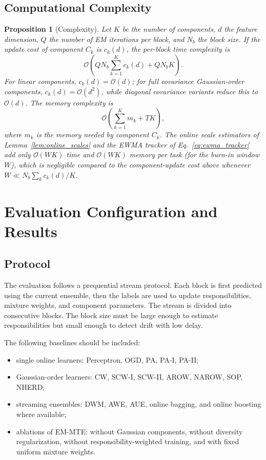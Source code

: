 ﻿\documentclass[12pt,a4paper]{article}
\newtheorem{proposition}{Proposition}
\begin{document}
\subsection{Computational Complexity}
\begin{proposition}[Complexity]
Let $K$ be the number of components, $d$ the feature dimension, $Q$ the
number of EM iterations per block, and $N_b$ the block size. If the update
cost of component $C_k$ is $c_k(d)$, the per-block time complexity is
\begin{equation}
\mathcal{O}\!\left(QN_b\sum_{k=1}^{K}c_k(d)+QN_bK\right).
\end{equation}
For linear components, $c_k(d)=\mathcal{O}(d)$; for full covariance
Gaussian-order components, $c_k(d)=\mathcal{O}(d^2)$, while diagonal
covariance variants reduce this to $\mathcal{O}(d)$. The memory complexity
is
\begin{equation}
\mathcal{O}\!\left(\sum_{k=1}^{K}m_k+TK\right),
\end{equation}
where $m_k$ is the memory needed by component $C_k$. The online scale
estimators of Lemma~\ref{lem:online_scales} and the EWMA tracker of
Eq.~\eqref{eq:ewma_tracker} add only $\mathcal{O}(WK)$ time and
$\mathcal{O}(WK)$ memory per task (for the burn-in window $W$), which is
negligible compared to the component-update cost above whenever
$W\ll N_b\sum_k c_k(d)/K$.
\end{proposition}

\section{Evaluation Configuration and Results}
\label{sec:evaluation}
\subsection{Protocol}
The evaluation follows a prequential stream protocol. Each block is first predicted using the current ensemble, then the labels are used to update responsibilities, mixture weights, and component parameters. The stream is divided into consecutive blocks. The block size must be large enough to estimate responsibilities but small enough to detect drift with low delay.

The following baselines should be included:
\begin{itemize}
  \item single online learners: Perceptron, OGD, PA, PA-I, PA-II;
  \item Gaussian-order learners: CW, SCW-I, SCW-II, AROW, NAROW, SOP, NHERD;
  \item streaming ensembles: DWM, AWE, AUE, online bagging, and online boosting where available;
  \item ablations of EM-MTE: without Gaussian components, without diversity regularization, without responsibility-weighted training, and with fixed uniform mixture weights.
\end{itemize}
\end{document}
